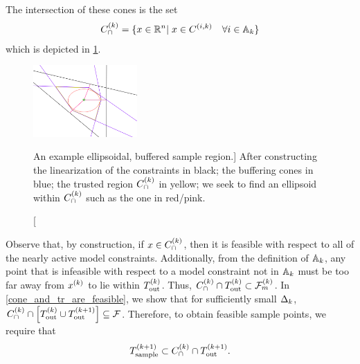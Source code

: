 The intersection of these cones is the set
\begin{align}
{C^{(k)}_{\cap}} = \{x\in\mathbb R^n | \; x \in {C^{(i, k)}} \quad \forall i \in {\mathbb A_{k}} \} \label{define_capcones}
\end{align}
which is depicted in \cref{completed_2}.

\begin{figure}[ht]
    \centering
    \includegraphics[width=150px]{images/completed_2.png}
    \caption
    	[An example ellipsoidal, buffered sample region.]{
    	After constructing 
    	the linearization of the constraints in black;
    	the buffering cones in blue;
    	the trusted region ${C^{(k)}_{\cap}}$ in yellow;
    	we seek to find an ellipsoid within ${C^{(k)}_{\cap}}$ such as the one in red/pink.
	}
    \label{completed_2}
\end{figure}

Observe that, by construction,  if $x \in {C^{(k)}_{\cap}}$, then it is feasible with respect to all of the nearly active model constraints.
Additionally,  from the definition of ${\mathbb A_{k}}$, any point that is infeasible with respect to a model constraint not in ${\mathbb A_{k}}$
must be too far away from $x^{(k)}$ to lie within  ${T_{\text{out}}^{(k)}}$.
Thus,  ${C^{(k)}_{\cap}} \cap {T_{\text{out}}^{(k)}} \subset {\mathcal F_m^{(k)}}$.
In \cref{cone_and_tr_are_feasible}, we show that for sufficiently small $\Delta_k$, ${C^{(k)}_{\cap}} \cap \left[{T_{\text{out}}^{(k)}} \cup {T_{\text{out}}^{(k+1)}}\right] \subseteq {\mathcal F}$.
Therefore, to obtain feasible sample points, we require that 
\begin{align*}
{T_{\text{sample}}^{(k+1)}} \subset {C^{(k)}_{\cap}} \cap {T_{\text{out}}^{(k+1)}}.
\end{align*}






